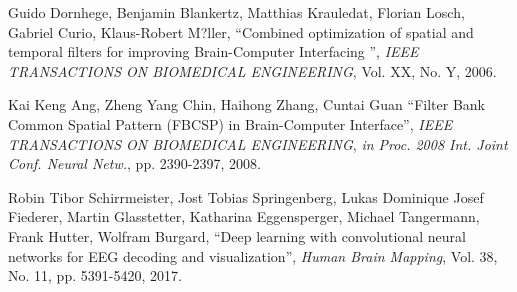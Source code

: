 \documentclass[a4paper,11pt,oneside,openany, report]{jsbook}
\begin{document}
\begin{thebibliography}{99}
   Guido Dornhege, Benjamin Blankertz, Matthias Krauledat, Florian Losch, Gabriel Curio, Klaus-Robert M?ller,
      ``Combined optimization of spatial and temporal
      filters for improving Brain-Computer Interfacing
      '',
      {\it IEEE TRANSACTIONS ON BIOMEDICAL ENGINEERING},
      Vol. XX,
      No. Y,
      2006.

   Kai Keng Ang, Zheng Yang Chin, Haihong Zhang, Cuntai Guan
      ``Filter Bank Common Spatial Pattern (FBCSP) in Brain-Computer Interface'',
      {\it IEEE TRANSACTIONS ON BIOMEDICAL ENGINEERING},
      {\it in Proc. 2008 Int. Joint Conf. Neural Netw.},
      pp. 2390-2397,
      2008.

   Robin Tibor Schirrmeister,
      Jost Tobias Springenberg,
      Lukas Dominique Josef Fiederer,
      Martin Glasstetter,
      Katharina Eggensperger,
      Michael Tangermann,
      Frank Hutter,
      Wolfram Burgard,
      ``Deep learning with convolutional neural networks for EEG decoding and visualization'',
      {\it Human Brain Mapping},
      Vol. 38,
      No. 11,
      pp. 5391-5420,
      2017.
\end{thebibliography}
%
%
% 
%
%
\newpage
\printindex
%
%
\end{document}
